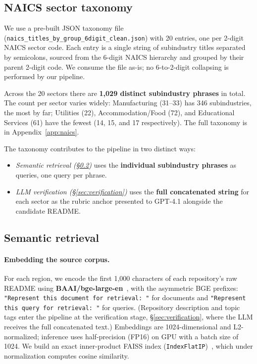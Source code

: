 \documentclass{article}
\begin{document}
\subsection{NAICS sector taxonomy}
\label{sec:naics-taxonomy}

We use a pre-built JSON taxonomy file
(\texttt{naics\_titles\_by\_group\_6digit\_clean.json}) with 20 entries,
one per 2-digit NAICS sector code. Each entry is a single string of
subindustry titles separated by semicolons, sourced from the 6-digit
NAICS hierarchy and grouped by their parent 2-digit code. We consume
the file as-is; no 6-to-2-digit collapsing is performed by our
pipeline.

Across the 20 sectors there are \textbf{1{,}029 distinct subindustry
phrases} in total. The count per sector varies widely: Manufacturing
(31--33) has 346 subindustries, the most by far; Utilities (22),
Accommodation/Food (72), and Educational Services (61) have the
fewest (14, 15, and 17 respectively). The full taxonomy is in
Appendix~\ref{app:naics}.

The taxonomy contributes to the pipeline in two distinct ways:
\begin{itemize}
  \item \emph{Semantic retrieval (\S\ref{sec:retrieval})} uses the
    \textbf{individual subindustry phrases} as queries, one query per
    phrase.
  \item \emph{LLM verification (\S\ref{sec:verification})} uses the
    \textbf{full concatenated string} for each sector as the rubric
    anchor presented to GPT-4.1 alongside the candidate README.
\end{itemize}

\subsection{Semantic retrieval}
\label{sec:retrieval}

\paragraph{Embedding the source corpus.}
For each region, we encode the first 1{,}000 characters of each
repository's raw README using
\textbf{BAAI/bge-large-en}~\citep{xiao2023cpack}, with the asymmetric
BGE prefixes: \texttt{"Represent this document for retrieval: "} for
documents and \texttt{"Represent this query for retrieval: "} for
queries. (Repository description and topic tags enter the pipeline at
the verification stage, \S\ref{sec:verification}, where the LLM
receives the full concatenated text.) Embeddings are 1024-dimensional
and L2-normalized; inference uses half-precision (FP16) on GPU with a
batch size of 1024. We build an exact inner-product FAISS index
(\texttt{IndexFlatIP})~\citep{johnson2021faiss}, which under
normalization computes cosine similarity.
\end{document}
